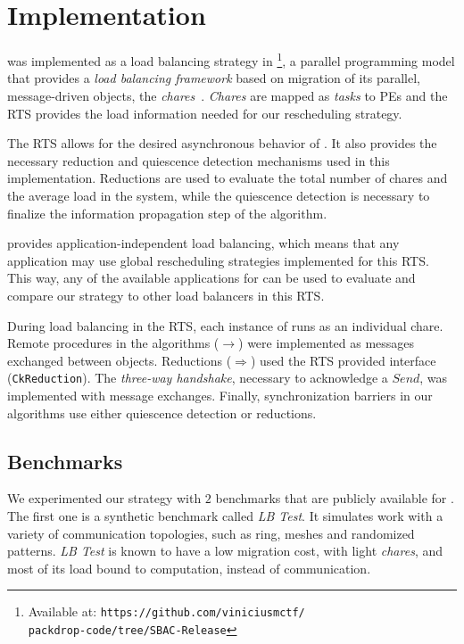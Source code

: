 \section{Implementation} \label{sec:impl}

\packdrop was implemented as a load balancing strategy in \charm\footnote{Available at: \texttt{https://github.com/viniciusmctf/\\packdrop-code/tree/SBAC-Release}}, a parallel programming model that provides a \textit{load balancing framework} based on migration of its parallel, message-driven objects, the \textit{chares}~\cite{CharmLOTR}.
\textit{Chares} are mapped as \textit{tasks} to PEs and the \charm RTS provides the load information needed for our rescheduling strategy.

The \charm RTS allows for the desired asynchronous behavior of \packdrop.
It also provides the necessary reduction and quiescence detection mechanisms used in this implementation.
Reductions are used to evaluate the total number of chares and the average load in the system, while the quiescence detection is necessary to finalize the information propagation step of the algorithm.

\charm provides application-independent load balancing, which means that any application may use global rescheduling strategies implemented for this RTS.
This way, any of the available applications for \charm can be used to evaluate and compare our strategy to other load balancers in this RTS.

During load balancing in the \charm RTS, each instance of \packdrop runs as an individual chare.
Remote procedures in the algorithms ($\rightarrow$) were implemented as messages exchanged between objects.
Reductions ($\Rightarrow$) used the RTS provided interface ({\small\texttt{CkReduction}}).
The \textit{three-way handshake}, necessary to acknowledge a $Send$, was implemented with message exchanges.
Finally, synchronization barriers in our algorithms use either quiescence detection or reductions.

\subsection{Benchmarks} \label{sec:benchmarks}

We experimented our strategy with $2$ benchmarks that are publicly available for \charm.
The first one is a synthetic benchmark called \textit{LB Test}. 
It simulates work with a variety of communication topologies, such as ring, meshes and randomized patterns.
\textit{LB Test} is known to have a low migration cost, with light \textit{chares}, and most of its load bound to computation, instead of communication.

